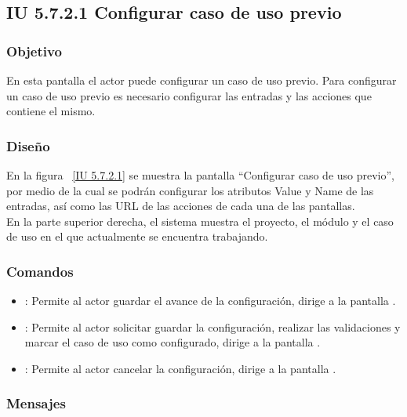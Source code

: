 \newpage 
\subsection{IU 5.7.2.1 Configurar caso de uso previo}
\subsubsection{Objetivo}
	
	En esta pantalla el actor puede configurar un caso de uso previo. Para configurar un caso de uso previo es necesario configurar las entradas y las acciones que contiene el mismo.

\subsubsection{Diseño}

    En la figura ~\ref{IU 5.7.2.1} se muestra la pantalla ``Configurar caso de uso previo'', por medio de la cual 
    se podrán configurar los atributos Value y Name de las entradas, así como las URL de las acciones de cada una de las pantallas.\\
	
	En la parte superior derecha, el sistema muestra el proyecto, el módulo y el caso de uso  en el que actualmente se encuentra trabajando.



\subsubsection{Comandos}
\begin{itemize}
	\item {}: Permite al actor guardar el avance de la configuración, dirige a la pantalla .
	\item {}: Permite al actor solicitar guardar la configuración, realizar las validaciones y marcar el caso de uso como configurado, dirige a la pantalla .
	\item {}: Permite al actor cancelar la configuración, dirige a la pantalla .
	
	
\end{itemize}

\subsubsection{Mensajes}

